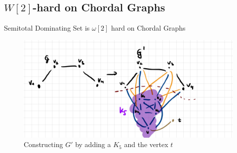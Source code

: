 \subsection{\hmath $W[2]$-hard on Chordal Graphs}
\begin{theorem}
    Semitotal Dominating Set is $\omega[2]$ hard on Chordal Graphs
\end{theorem}

\begin{figure}[th]
    \includegraphics[scale=0.16]{pages/img/construct-chordal-reduction.jpg}
    \centering
    \caption{Constructing $G'$ by adding a $K_5$ and the vertex $t$}
    \label{fig:construct-chordal-reduction}
\end{figure}

